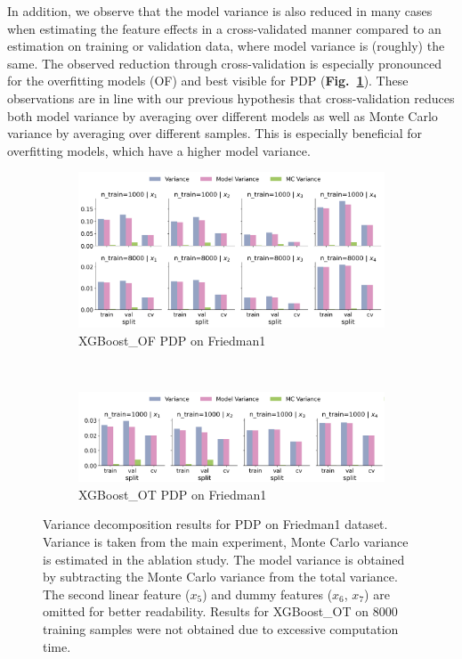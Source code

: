 \documentclass[runningheads]{llncs}
\begin{document}
In addition, we observe that the model variance is also reduced in many cases when
estimating the feature effects in a cross-validated manner compared to an estimation
on training or validation data, where model variance is (roughly) the same. The observed
reduction through cross-validation is especially
pronounced for the overfitting models (OF) and best visible for PDP
(\textbf{Fig.\@~\ref{fig:pdp-variance-decomp}}). These observations are in line
with our previous hypothesis that cross-validation reduces both model variance by averaging over
different models as well as Monte Carlo variance by averaging over different
samples. This is especially beneficial for overfitting models, which have a
higher model variance.

\begin{figure}[htbp]
    \centering
    \begin{subfigure}[b]{0.75\textwidth}
        \includegraphics[width=\textwidth]{img/variance_decomposition_pdp_XGBoost_OF.png}
        \caption{XGBoost\_OF PDP on Friedman1}
    \end{subfigure}
    \\[10pt]
    \vfill
    \begin{subfigure}[b]{0.75\textwidth}
        \includegraphics[width=\textwidth]{img/variance_decomposition_pdp_XGBoost_OT.png}
        \caption{XGBoost\_OT PDP on Friedman1}
    \end{subfigure}
    \caption{Variance decomposition results for PDP on Friedman1 dataset. Variance is taken from the
        main experiment, Monte Carlo variance is estimated in the ablation study. The model variance is
        obtained by subtracting the Monte Carlo variance from the total variance. The second linear feature
        ($x_5$) and dummy features ($x_6$, $x_7$) are omitted for better readability. Results for XGBoost\_OT
        on 8000 training samples were not obtained due to excessive computation time.}
    \label{fig:pdp-variance-decomp}  %
\end{figure}
\end{document}
